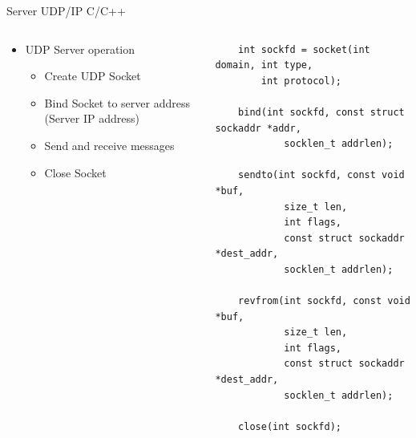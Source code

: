 \begin{frame}[fragile]{Server UDP/IP  C/C++} %
    \begin{columns}
        \begin{column}{0.35\textwidth}
            \begin{itemize}
                \item UDP Server operation
                    \begin{itemize}
                        \item Create UDP Socket
                        \item Bind Socket to server address (Server IP address)
                        \item Send and receive messages
                        \item Close Socket
                    \end{itemize}
            \end{itemize}  
        \end{column}
        \begin{column}{0.65\textwidth}
            \begin{verbatim}
    int sockfd = socket(int domain, int type, 
        int protocol);
    
    bind(int sockfd, const struct sockaddr *addr, 
            socklen_t addrlen);
    
    sendto(int sockfd, const void *buf, 
            size_t len, 
            int flags, 
            const struct sockaddr *dest_addr, 
            socklen_t addrlen);
    
    revfrom(int sockfd, const void *buf, 
            size_t len, 
            int flags, 
            const struct sockaddr *dest_addr, 
            socklen_t addrlen);

    close(int sockfd);
    
             \end{verbatim}      
        \end{column}   
    \end{columns}
\end{frame}

